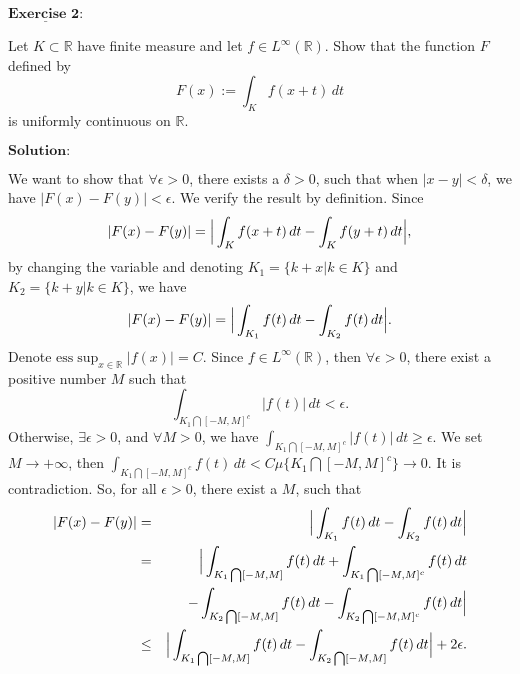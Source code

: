 \documentclass[12pt,a4paper]{ctexart}
\begin{document}
\newpage

$\underline{\textbf{Exercise 2:}}$

Let $K \subset \mathbb{R}$ have finite measure and let $f \in L^{\infty} (\mathbb{R})$. Show that the function $F$ defined by 
\begin{equation*}
   F(x):= \int_{K}^{} f(x + t) \, d t
\end{equation*}
is uniformly continuous on $\mathbb{R}$.

\vspace{8pt}
$\textbf{Solution:}$

We want to show that $\forall \epsilon > 0$, there exists a $\delta > 0$, such that when $|x - y| < \delta$, we have $|F(x) - F(y)| < \epsilon$. We verify the result by definition. Since
\begin{equation*}
   |F(x) - F(y)|  =  \Big{|} \int_{K}^{} f(x + t) \, d t - \int_{K}^{} f(y + t) \, d t \Big{|},
\end{equation*}
by changing the variable and denoting $K_{1} = \{k + x| k \in K \}$ and $K_{2} = \{ k + y| k \in K \}$, we have
\begin{equation*}
   |F(x) - F(y)|  =  \Big{|} \int_{K_{1}}^{} f(t) \, d t - \int_{K_{2}}^{} f(t) \, d t \Big{|}.
\end{equation*}
Denote $\text{ess} \sup_{x \in \mathbb{R}} |f(x)| = C$. Since $f \in L^{\infty} (\mathbb{R})$, then $\forall \epsilon > 0$, there exist a positive number $M$ such that
\begin{equation*}
    \int_{K_{1} \bigcap [-M, M]^{c}}^{} |f(t)| \, d t < \epsilon.
\end{equation*}
Otherwise, $\exists \epsilon > 0$, and $\forall M > 0$, we have $\int_{K_{1} \bigcap [-M, M]^{c}}^{} |f(t)| \, d t \geq \epsilon$. We set $M \to + \infty$, then $\int_{K_{1} \bigcap [-M, M]^{c}}^{} f(t) \, d t  < C \mu \{K_{1} \bigcap [-M, M]^{c} \} \to 0$. It is contradiction. So, for all $\epsilon > 0$, there exist a $M$, such that
\begin{eqnarray*}
|F(x) - F(y)| & = & \Big{|} \int_{K_{1}}^{} f(t) \, d t - \int_{K_{2}}^{} f(t) \, d t \Big{|} \\
& = & \Big{|} \int_{K_{1} \bigcap [-M, M]}^{} f(t) \, d t  + \int_{K_{1} \bigcap [-M, M]^{c}}^{} f(t) \, d t  \\
& & - \int_{K_{2} \bigcap [-M, M]}^{} f(t) \, d t - \int_{K_{2} \bigcap [-M, M]^{c}}^{} f(t) \, d t \Big{|}   \\
&\leq&  \Big{|} \int_{K_{1} \bigcap [-M, M]}^{} f(t) \, d t - \int_{K_{2} \bigcap [-M, M]}^{} f(t) \, d t \Big{|} + 2 \epsilon.
\end{eqnarray*}
\end{document}
